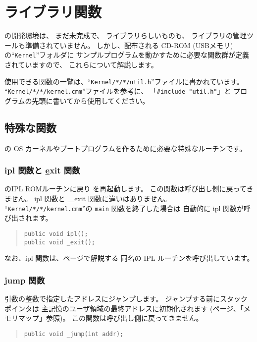 % 
%
\chapter{ライブラリ関数}

\tac の開発環境は、
まだ未完成で、
ライブラリらしいものも、
ライブラリの管理ツールも準備されていません。
しかし、配布される CD-ROM (USBメモリ) の``{\tt Kernel}''フォルダに
サンプルプログラムを動かすために必要な関数群が定義されていますので、
これらについて解説します。

使用できる関数の一覧は、``{\tt Kernel/*/*/util.h}''ファイルに書かれています。
``{\tt Kernel/*/*/kernel.cmm}''ファイルを参考に、
「\verb/#include "util.h"/」と
プログラムの先頭に書いてから使用してください。

\section{特殊な関数}

\tac の OS カーネルやブートプログラムを作るために必要な特殊なルーチンです。

\subsection{ipl 関数と \ul exit 関数}
\tac のIPL ROMルーチンに戻り \tac を再起動します。
この関数は呼び出し側に戻ってきません。
ipl 関数と \underline{~~}exit 関数に違いはありません。
``{\tt Kernel/*/*/kernel.cmm}''の \verb/main/ 関数を終了した場合は
自動的に ipl 関数が呼び出されます。

\begin{quote}
\begin{verbatim}
public void ipl();
public void _exit();
\end{verbatim}
\end{quote}

なお、ipl 関数は、\pageref{app:ipl}ページで解説する
同名の IPL ルーチンを呼び出しています。

\subsection{\ul jump 関数}

引数の整数で指定したアドレスにジャンプします。
ジャンプする前にスタックポインタは
\tac 主記憶のユーザ領域の最終アドレスに初期化されます
(\pageref{app:memmap}ページ、「メモリマップ」参照)。
この関数は呼び出し側に戻ってきません。

\begin{quote}
\begin{verbatim}
public void _jump(int addr);
\end{verbatim}
\end{quote}

